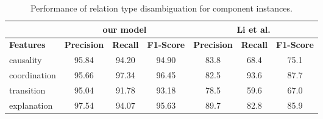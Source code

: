 \begin{table}[ht]
\centering
\begin{tabular}{|l|c|c|c|c|c|c|}
\hline

                        & \multicolumn{3}{c|}{our model}            & \multicolumn{3}{c|}{Li et al.}            \\ \hline
\bf Features            & \bf Precision & \bf Recall & \bf F1-Score & \bf Precision & \bf Recall & \bf F1-Score \\ \hline
    causality           &     95.84     &     94.20  &     94.90    &     83.8      &     68.4   &     75.1     \\ \hline
    coordination        &     95.66     &     97.34  &     96.45    &     82.5      &     93.6   &     87.7     \\ \hline
    transition          &     95.04     &     91.78  &     93.18    &     78.5      &     59.6   &     67.0     \\ \hline
    explanation         &     97.54     &     94.07  &     95.63    &     89.7      &     82.8   &     85.9     \\ \hline

\end{tabular}
\caption{\label{t:sense-word-types} Performance of relation type
disambiguation for component instances. }
\end{table}
